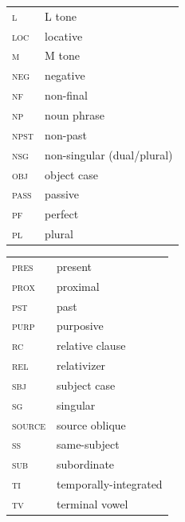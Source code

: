 \documentclass[output=paper]{langsci/langscibook}
\begin{document}
\begin{tabularx}{.45\textwidth}{lX} 
\textsc{l}     & L tone\\
\textsc{loc}     & locative\\
\textsc{m}     & M tone\\
\textsc{neg}     & negative\\
\textsc{nf}      & non-final\\
\textsc{np}     & noun phrase\\
\textsc{npst}     & non-past\\
\textsc{nsg}     & non-singular (dual/plural)\\
\textsc{obj}     & object case\\
\textsc{pass}     & passive \\
\textsc{pf}     & perfect\\
\textsc{pl}     & plural\\
\end{tabularx}
\begin{tabularx}{.45\textwidth}{lX} 
\textsc{pres}     & present \\
\textsc{prox}     & proximal\\
\textsc{pst}     & past \\
\textsc{purp}     & purposive\\
\textsc{rc}     & relative clause\\
\textsc{rel}     & relativizer\\
\textsc{sbj}     & subject case\\
\textsc{sg}     & singular\\
\textsc{source}   & source oblique\\
\textsc{ss}     & same-subject\\
\textsc{sub}    & subordinate\\
\textsc{ti}     & temporally-integrated\\
\textsc{tv}    & terminal vowel\\
\end{tabularx}


 

\printbibliography[heading=subbibliography,notkeyword=this]
\end{document}
